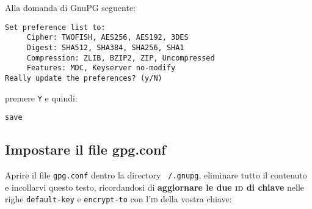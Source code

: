 \documentclass[a4paper,10pt]{article}
\begin{document}
Alla domanda di GnuPG seguente:

\begin{verbatim}
Set preference list to:
     Cipher: TWOFISH, AES256, AES192, 3DES
     Digest: SHA512, SHA384, SHA256, SHA1
     Compression: ZLIB, BZIP2, ZIP, Uncompressed
     Features: MDC, Keyserver no-modify
Really update the preferences? (y/N)
\end{verbatim}

premere \texttt{Y} e quindi:

\begin{verbatim}
save
\end{verbatim}

\subsection{Impostare il file gpg.conf}

Aprire il file \texttt{gpg.conf} dentro la directory \texttt{~/.gnupg}, eliminare tutto il contenuto e incollarvi questo testo, ricordandosi di \textbf{aggiornare le due \textsc{id} di chiave} nelle righe \texttt{default-key} e \texttt{encrypt-to} con l'\textsc{id} della vostra chiave:
\end{document}
